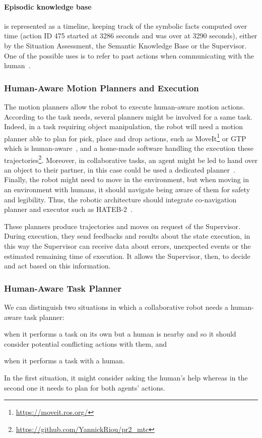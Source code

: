 \documentclass[a4paper,11pt,twoside]{StyleThese}
\begin{document}
\paragraph{Episodic knowledge base} is represented as a timeline, keeping track of the symbolic facts computed over time (\eg action ID 475 started at 3286 seconds and was over at 3290 seconds), either by the Situation Assessment, the Semantic Knowledge Base or the Supervisor. One of the possible uses is to refer to past actions when communicating with the human~\citep{sarthou_2021_extending}.


\subsubsection{Human-Aware Motion Planners and Execution}\label{chap3:subsubsec:motion}
The motion planners allow the robot to execute human-aware motion actions. According to the task needs, several planners might be involved for a same task. Indeed, in a task requiring object manipulation, the robot will need a motion planner able to plan for pick, place and drop actions, such as MoveIt\footnote{\url{https://moveit.ros.org/}} or GTP which is human-aware~\citep{waldhart_2016_novel}, and a home-made software handling the execution these trajectories\footnote{\url{https://github.com/YannickRiou/pr2_mtc}}. Moreover, in collaborative tasks, an agent might be led to hand over an object to their partner, in this case could be used a dedicated planner~\citep{mainprice_2012_sharing}. Finally, the robot might need to move in the environment, but when moving in an environment with humans, it should navigate being aware of them for safety and legibility. Thus, the robotic architecture should integrate co-navigation planner and executor such as HATEB-2~\citep{singamaneni_2020_hateb}. 

These planners produce trajectories and moves on request of the Supervisor. During execution, they send feedbacks and results about the state execution, in this way the Supervisor can receive data about errors, unexpected events or the estimated remaining time of execution. It allows the Supervisor, then, to decide and act based on this information.

\subsubsection{Human-Aware Task Planner}\label{chap3:subsubsec:task_planner}
We can distinguish two situations in which a collaborative robot needs a human-aware task planner: 
\begin{inlineEnumerate}
	\item when it performs a task on its own but a human is nearby and so it should consider potential conflicting actions with them, and
	\item when it performs a task with a human.
\end{inlineEnumerate} 
In the first situation, it might consider asking the human's help whereas in the second one it needs to plan for both agents' actions. 
\end{document}

